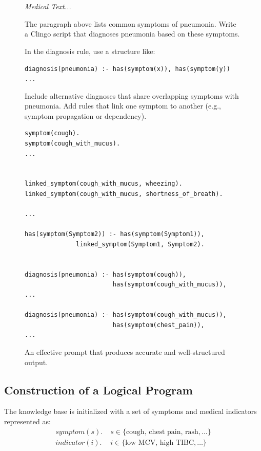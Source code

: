 \documentclass[10pt,leqno]{amsart}
\newcommand{\src}[1]{\texttt{#1}}
\newenvironment{commandline}{
	\medskip
	\begin{mdframed}[style=commandline]
}{
	\end{mdframed}
	\medskip
}
\newenvironment{prompt}[1][Prompt:]{ %
	\medskip
	\begin{mdframed}[style=warning]
		\noindent{\textbf{#1}}
}{
	\end{mdframed}
}
\begin{document}
\begin{figure}[!h]
\begin{prompt}
\textit{Medical Text...}

The paragraph above lists common symptoms of pneumonia.
Write a Clingo script that diagnoses pneumonia based on these symptoms.

In the diagnosis rule, use a structure like:

\src{diagnosis(pneumonia) :- has(symptom(x)), has(symptom(y)) ...}

Include alternative diagnoses that share overlapping symptoms with pneumonia.
Add rules that link one symptom to another (e.g., symptom propagation or dependency).

\end{prompt}


\begin{commandline}
\scriptsize
\begin{verbatim}
symptom(cough).
symptom(cough_with_mucus).
...


linked_symptom(cough_with_mucus, wheezing).
linked_symptom(cough_with_mucus, shortness_of_breath).

...

has(symptom(Symptom2)) :- has(symptom(Symptom1)), 
              linked_symptom(Symptom1, Symptom2).


diagnosis(pneumonia) :- has(symptom(cough)),
                        has(symptom(cough_with_mucus)),
...

diagnosis(pneumonia) :- has(symptom(cough_with_mucus)),
                        has(symptom(chest_pain)),
...
\end{verbatim}
\end{commandline}
\caption{An effective prompt that produces accurate and well-structured output.}
\label{fig:good-prompt}
\end{figure}

\subsection{Construction of a Logical Program}

The knowledge base is initialized with a set of symptoms and medical indicators represented as:
\begin{align}
    symptom(s). & \; s \in \{ \text{cough, chest pain, rash}, \dots \} \\
    indicator(i). & \; i \in \{ \text{low MCV, high TIBC}, \dots \}
\end{align}
\end{document}
